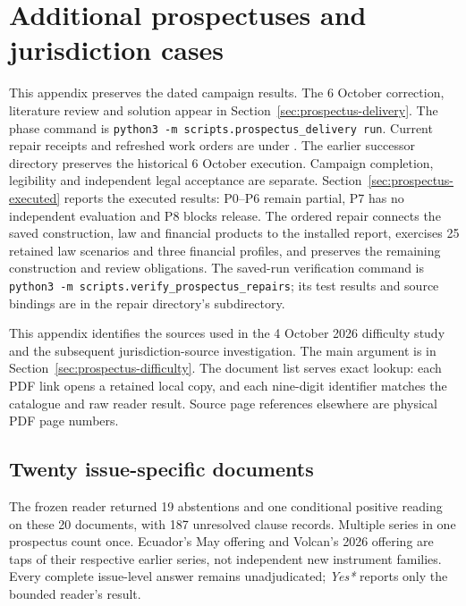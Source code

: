 \chapter{Additional prospectuses and jurisdiction cases}
\label{app:prospectus-difficulty}

This appendix preserves the dated campaign results. The 6 October correction,
literature review and solution appear in Section~\ref{sec:prospectus-delivery}.
The phase command is \texttt{python3 -m scripts.prospectus\_delivery run}.
Current repair receipts and refreshed work orders are under
.
The earlier successor directory preserves the historical 6 October execution.
Campaign completion, legibility and independent legal acceptance are separate.
Section~\ref{sec:prospectus-executed} reports the executed results: P0--P6
remain partial, P7 has no independent evaluation and P8 blocks release.
The ordered repair connects the saved construction, law and financial products
to the installed report, exercises 25 retained law scenarios and three financial
profiles, and preserves the remaining construction and review obligations.
The saved-run verification command is
\texttt{python3 -m scripts.verify\_prospectus\_repairs};
its test results and source bindings are in the repair directory's
 subdirectory.

This appendix identifies the sources used in the 4 October 2026 difficulty
study and the subsequent jurisdiction-source investigation. The main
argument is in Section~\ref{sec:prospectus-difficulty}. The document list
serves exact lookup: each PDF link opens a retained local copy, and each
nine-digit identifier matches the catalogue and raw reader result. Source
page references elsewhere are physical PDF page numbers.

\section{Twenty issue-specific documents}

The frozen reader returned 19 abstentions and one conditional positive
reading on these 20 documents, with 187 unresolved clause records. Multiple
series in one prospectus count once. Ecuador's May offering and Volcan's
2026 offering are taps of their respective earlier series, not independent
new instrument families. Every complete issue-level answer remains
unadjudicated; \emph{Yes*} reports only the bounded reader's result.

